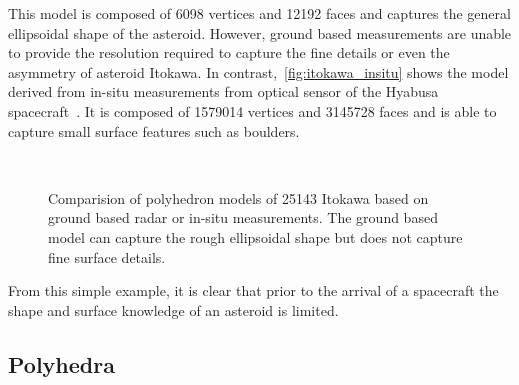 This model is composed of \num{6098} vertices and \num{12192} faces and captures the general ellipsoidal shape of the asteroid.
However, ground based measurements are unable to provide the resolution required to capture the fine details or even the asymmetry of asteroid Itokawa.
In contrast,~\cref{fig:itokawa_insitu} shows the model derived from in-situ measurements from optical sensor of the Hyabusa spacecraft~\cite{gaskell2008a}.
It is composed of \num{1579014} vertices and \num{3145728} faces and is able to capture small surface features such as boulders.
\begin{figure}
    \centering
    ~
    \caption[Comparison of Radar and In-situ Itokawa models]{Comparision of polyhedron models of 25143 Itokawa based on ground based radar or in-situ measurements.
        The ground based model can capture the rough ellipsoidal shape but does not capture fine surface details.}
\end{figure}
From this simple example, it is clear that prior to the arrival of a spacecraft the shape and surface knowledge of an asteroid is limited.
\subsection{Polyhedra}

